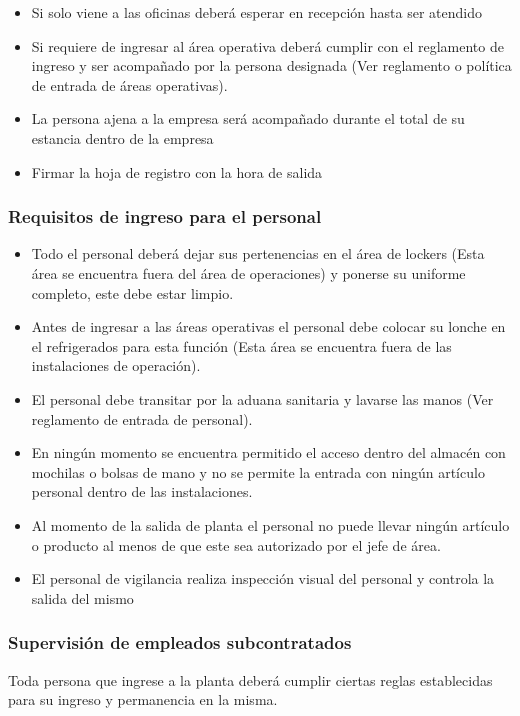 \begin{itemize}
\begin{enumerate}
	\end{enumerate}
	\item Si solo viene a las oficinas deberá esperar en recepción hasta ser atendido
	\item Si requiere de ingresar al área operativa deberá cumplir con el reglamento de ingreso y ser acompañado por la persona designada (Ver reglamento o política de entrada de áreas operativas).
	\item La persona ajena a la empresa será acompañado durante el total de su estancia dentro de la empresa
	\item Firmar la hoja de registro con la hora de salida
\end{itemize}

\subsubsection{Requisitos de ingreso para el personal}
\begin{itemize}
	\item Todo el personal deberá dejar sus pertenencias en el área de lockers (Esta área se encuentra fuera del área de operaciones) y ponerse su uniforme completo, este debe estar limpio.
	\item Antes de ingresar a las áreas operativas el personal debe colocar su lonche en el refrigerados para esta función (Esta área se encuentra fuera de las instalaciones de operación).
	\item El personal debe transitar por la aduana sanitaria y lavarse las manos (Ver reglamento de entrada de personal).
	\item En ningún momento se encuentra permitido el acceso dentro del almacén con mochilas o bolsas de mano y no se permite la entrada con ningún artículo personal dentro de las instalaciones.
	\item Al momento de la salida de planta el personal no puede llevar ningún artículo o producto al menos de que este sea autorizado por el jefe de área.
	\item El personal de vigilancia realiza inspección visual del personal y controla la salida del mismo
\end{itemize}

\subsubsection{Supervisión de empleados subcontratados}
Toda persona que ingrese a la planta deberá cumplir ciertas reglas establecidas para su ingreso y permanencia en la misma.

